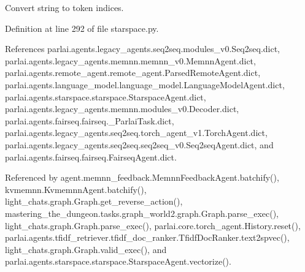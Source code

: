 \begin{DoxyVerb}Convert string to token indices.\end{DoxyVerb}
 

Definition at line 292 of file starspace.\+py.



References parlai.\+agents.\+legacy\+\_\+agents.\+seq2seq.\+modules\+\_\+v0.\+Seq2seq.\+dict, parlai.\+agents.\+legacy\+\_\+agents.\+memnn.\+memnn\+\_\+v0.\+Memnn\+Agent.\+dict, parlai.\+agents.\+remote\+\_\+agent.\+remote\+\_\+agent.\+Parsed\+Remote\+Agent.\+dict, parlai.\+agents.\+language\+\_\+model.\+language\+\_\+model.\+Language\+Model\+Agent.\+dict, parlai.\+agents.\+starspace.\+starspace.\+Starspace\+Agent.\+dict, parlai.\+agents.\+legacy\+\_\+agents.\+memnn.\+modules\+\_\+v0.\+Decoder.\+dict, parlai.\+agents.\+fairseq.\+fairseq.\+\_\+\+Parlai\+Task.\+dict, parlai.\+agents.\+legacy\+\_\+agents.\+seq2seq.\+torch\+\_\+agent\+\_\+v1.\+Torch\+Agent.\+dict, parlai.\+agents.\+legacy\+\_\+agents.\+seq2seq.\+seq2seq\+\_\+v0.\+Seq2seq\+Agent.\+dict, and parlai.\+agents.\+fairseq.\+fairseq.\+Fairseq\+Agent.\+dict.



Referenced by agent.\+memnn\+\_\+feedback.\+Memnn\+Feedback\+Agent.\+batchify(), kvmemnn.\+Kvmemnn\+Agent.\+batchify(), light\+\_\+chats.\+graph.\+Graph.\+get\+\_\+reverse\+\_\+action(), mastering\+\_\+the\+\_\+dungeon.\+tasks.\+graph\+\_\+world2.\+graph.\+Graph.\+parse\+\_\+exec(), light\+\_\+chats.\+graph.\+Graph.\+parse\+\_\+exec(), parlai.\+core.\+torch\+\_\+agent.\+History.\+reset(), parlai.\+agents.\+tfidf\+\_\+retriever.\+tfidf\+\_\+doc\+\_\+ranker.\+Tfidf\+Doc\+Ranker.\+text2spvec(), light\+\_\+chats.\+graph.\+Graph.\+valid\+\_\+exec(), and parlai.\+agents.\+starspace.\+starspace.\+Starspace\+Agent.\+vectorize().

